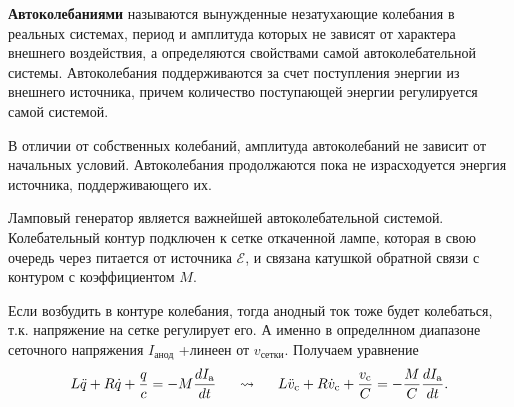 \phantom{239}

\textbf{Автоколебаниями} называются вынужденные незатухающие колебания в реальных системах, период и амплитуда которых не зависят от характера внешнего воздействия, а определяются свойствами самой автоколебательной системы. Автоколебания поддерживаются за счет поступления энергии из внешнего источника, причем количество поступающей энергии регулируется самой системой. 

В отличии от собственных колебаний, амплитуда автоколебаний не зависит от начальных условий. Автоколебания продолжаются пока не израсходуется энергия источника, поддерживающего их.

\begin{minipage}{0.70\linewidth}
	Ламповый генератор является важнейшей автоколебательной системой. Колебательный контур подключен к сетке откаченной лампе, которая в свою очередь через питается от источника $\mathscr{E}$, и связана катушкой обратной связи с контуром с коэффициентом $M$.

	Если возбудить в контуре колебания, тогда анодный ток тоже будет колебаться, т.к. напряжение на сетке регулирует его.
	А именно в определнном диапазоне сеточного напряжения $I_\text{анод} $ +линеен от $v_\text{сетки} $.
	Получаем уравнение 
\begin{equation}
	 L \ddot{q} +R \dot{q} + \frac{q}{c} = - M \frac{d I_\text{a}}{d t}
	 \hspace*{0.5 cm} \leadsto \hspace*{0.5 cm} L \ddot{v}_\text{c} +R \dot{v}_\text{c}+ \frac{v_\text{c}}{C} = - \frac{M}{C} \frac{d I_\text{a}}{d t}.
\end{equation}
\end{minipage}
